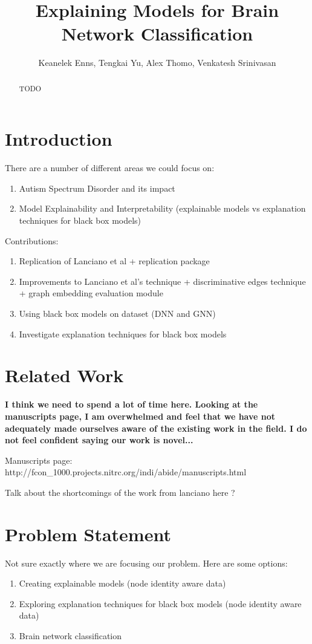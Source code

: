 \documentclass[letterpaper]{article}
\author{
Keanelek Enns, Tengkai Yu, Alex Thomo, Venkatesh Srinivasan\\
}
\title{Explaining Models for Brain Network Classification}
\begin{document}
\maketitle
\begin{abstract}
TODO
\end{abstract}

\section{Introduction}

There are a number of different areas we could focus on:
\begin{enumerate}
    \item Autism Spectrum Disorder and its impact
    \item Model Explainability and Interpretability (explainable models vs explanation techniques for black box models)
\end{enumerate}


Contributions:
\begin{enumerate}
    \item Replication of Lanciano et al \cite{lanciano2020} + replication package
    \item Improvements to Lanciano et al's technique + discriminative edges technique + graph embedding evaluation module
    \item Using black box models on dataset (DNN and GNN)
    \item Investigate explanation techniques for black box models
\end{enumerate}
  
\section{Related Work}
\textbf{I think we need to spend a lot of time here. Looking at the manuscripts page, I am overwhelmed and feel that we have not adequately made ourselves aware of the existing work in the field. I do not feel confident saying our work is novel...}

Manuscripts page: http://fcon\_1000.projects.nitrc.org/indi/abide/manuscripts.html

Talk about the shortcomings of the work from lanciano here \cite{lanciano2020}?

\section{Problem Statement}
Not sure exactly where we are focusing our problem. Here are some options:
\begin{enumerate}
    \item Creating explainable models (node identity aware data)
    \item Exploring explanation techniques for black box models (node identity aware data) 
    \item Brain network classification
\end{enumerate}
\end{document}
